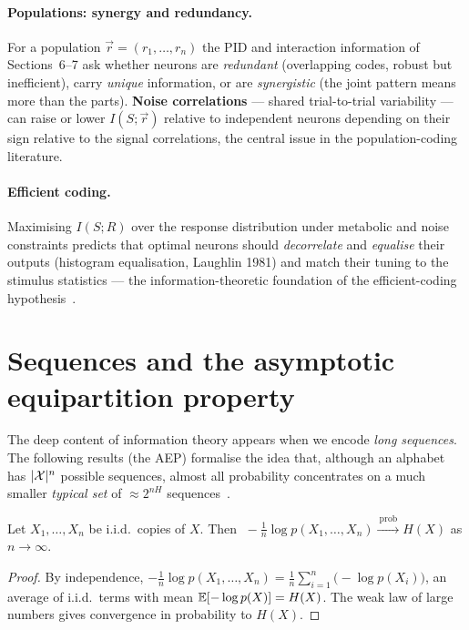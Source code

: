 \documentclass[11pt]{article}
\begin{document}
\paragraph{Populations: synergy and redundancy.}
For a population $\vec r=(r_1,\dots,r_n)$ the PID and interaction information of
Sections~6--7 ask whether neurons are \emph{redundant} (overlapping codes, robust but inefficient),
carry \emph{unique} information, or are \emph{synergistic} (the joint pattern means more than the
parts). \textbf{Noise correlations} --- shared trial-to-trial variability --- can raise or lower
$I(S;\vec r)$ relative to independent neurons depending on their sign relative to the signal
correlations, the central issue in the population-coding literature.

\paragraph{Efficient coding.}
Maximising $I(S;R)$ over the response distribution under metabolic and noise constraints predicts
that optimal neurons should \emph{decorrelate} and \emph{equalise} their outputs (histogram
equalisation, Laughlin 1981) and match their tuning to the stimulus statistics --- the
information-theoretic foundation of the efficient-coding hypothesis~\cite{barlow1961,laughlin1981}.

\section{Sequences and the asymptotic equipartition property}
The deep content of information theory appears when we encode \emph{long sequences}. The following
results (the AEP) formalise the idea that, although an alphabet has $\lvert\mathcal X\rvert^n$ possible
sequences, almost all probability concentrates on a much smaller \emph{typical set} of $\approx
2^{nH}$ sequences~\cite{cohen2024,coverthomas}.

\begin{theorem}
Let $X_1,\dots,X_n$ be i.i.d.\ copies of $X$. Then
$\;-\tfrac1n\log p(X_1,\dots,X_n)\xrightarrow{\ \mathrm{prob}\ }H(X)$ as $n\to\infty$.
\end{theorem}
\begin{proof}
By independence, $-\tfrac1n\log p(X_1,\dots,X_n)=\tfrac1n\sum_{i=1}^n\big(-\log p(X_i)\big)$, an
average of i.i.d.\ terms with mean $\mathbb{E}[-\log p(X)]=H(X)$. The weak law of large numbers gives
convergence in probability to $H(X)$.
\end{proof}
\end{document}
